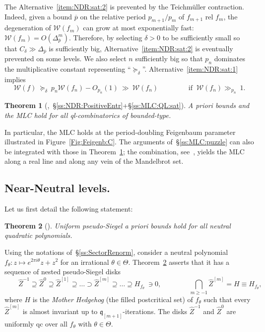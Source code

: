 \documentclass[twoside,leqno]{article}
\theoremstyle{plain}
\newtheorem{thm}{Theorem}[section]
\newcommand{\Width}{{\mathcal W}}
\newcommand{\wZ}{{\widehat Z}}
\newcommand{\qq}{\mathfrak{q}}
\begin{document}
The Alternative~\ref{item:NDR:sat:2} is prevented by the Teichm\"uller contraction. Indeed, given a bound $\overline p$ on the relative period $p_{m+1}/p_m$ of $f_{m+1}$ rel $f_m$, the degeneration of $\Width(f_m)$ can grow at most exponentially fast:
$\Width(f_m)=O(\Delta^m_{\overline p})$. Therefore, by selecting $\delta>0$ to be sufficiently small so that $C_\delta\gg \Delta_{\overline p}$ is sufficiently big, Alternative~\ref{item:NDR:sat:2} is eventually prevented on some levels. We also select $n$ sufficiently big so that $p_n$ dominates the multiplicative constant representing ``$\succeq_\delta$''.  Alternative~\ref{item:NDR:sat:1} implies \[ \Width(f)\ \succeq_\delta \ p_n\Width(f_n) -O_{p_n}(1)\ \gg\  \Width(f_n)\qquad \qquad \text{ if }\  \Width(f_n)\gg_{p_n} \ 1.\] 



\begin{thm}[\cite{DLFeig},\ \S\ref{ss:NDR:PositiveEntr}+\S\ref{ss:MLC:QL:sat}]
\label{thm:MLC:Feigenb} A priori bounds and the MLC hold for all ql-combinatorics of bounded-type. 
\end{thm}
\noindent In particular, the MLC holds at the period-doubling Feigenbaum parameter illustrated in Figure~\ref{Fig:Feigenb:C}. The arguments of~\S\ref{ss:MLC:puzzle} can also be integrated with those in Theorem~\ref{thm:MLC:Feigenb}; the combination, see~\cite{DKL}, yields the MLC along a real line and along any vein of the Mandelbrot set.


\subsection{Near-Neutral levels.} \label{ss:MLC:QL:neut} Let us first detail the following statement:
\begin{thm}[\cite{DL_Uniform}]
\label{thm:wZ}
Uniform pseudo-Siegel a priori bounds hold for all neutral quadratic polynomials.
\end{thm}

Using the notations of~\S\ref{ss:SectorRenorm}, consider a neutral polynomial $f_\theta \colon z\mapsto e^{2\pi i \theta}z +z^2$ for an irrational $\theta\in \Theta$. Theorem~\ref{thm:wZ} asserts that it has a sequence of nested pseudo-Siegel disks 
\begin{equation}
    \label{eq:dfn:wZ^m:intro}\qquad
\wZ^{-1}\supseteq \wZ^{0}\supseteq \wZ^{[1]}\supseteq \dots \supset \wZ^{[m]}\supseteq \dots \supseteq H_{f_\theta}\ \ni 0, \qquad \qquad \bigcap_{m\ge -1} \wZ^{[m]} =H\equiv H_{f_\theta},
\end{equation}
where $H$ is the \emph{Mother Hedgehog} (the filled postcritical set) of ${f_\theta}$ such that every $\wZ^{[m]}$ is almost invariant up to $\qq_{[m+1]}$-iterations. The disks $\wZ^{-1}$ and $\wZ^0$ are uniformly qc over all $f_\theta$ with $\theta\in \Theta$. 
\end{document}
